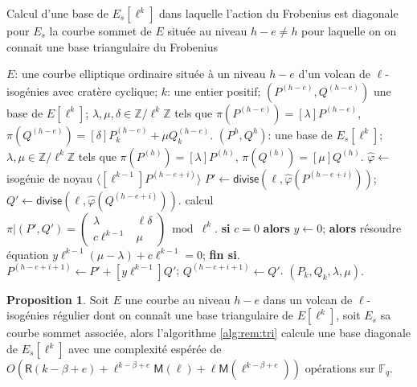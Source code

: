 \documentclass[10pt,a4paper]{book}
\theoremstyle{plain}
\theoremstyle{definition}
\theoremstyle{definition}
\theoremstyle{definition}
\newtheorem{prop}[thm]{Proposition}
\theoremstyle{definition}
\theoremstyle{remark}
\theoremstyle{remark}
\theoremstyle{definition}
\begin{document}
\begin{algorithm}
\caption{\label{alg:rem:tri}Calcul d'une base de $E_s[\ell^k]$ dans laquelle l'action du Frobenius est diagonale pour $E_s$ la courbe sommet de $E$ située au niveau $h-e \neq h$ pour laquelle on on connait une base triangulaire du Frobenius}
\begin{algorithmic}[1]
\REQUIRE $E$: une courbe elliptique ordinaire située à un niveau $h-e$ d'un volcan de $\ell$-isogénies avec cratère cyclique;
$k$: une entier positif; $(P^{(h-e)},Q^{(h-e)})$ une base de $E[\ell^k]$; $\lambda, \mu, \delta \in \mathbb{Z}/\ell^k \mathbb{Z}$
tels que $\pi(P^{(h-e)})= [\lambda] P^{(h-e)}$, $ \pi(Q^{(h-e)})=[\delta] P^{(h-e)}_{k} +  \mu Q^{(h-e)}_{k}$.
\ENSURE $(P^{h}, Q^{h} )$: une base de $E_s[\ell^k]$;
$\lambda, \mu \in \mathbb{Z}/\ell^k \mathbb{Z}$
tels que $\pi(P^{(h)})= [\lambda] P^{(h)}$, $ \pi(Q^{(h)})= [\mu] Q^{(h)}$.
\STATE\label{alg:rem:iso}  $\widehat{\varphi} \leftarrow $ isogénie de noyau $\langle [\ell^{k-1}]P^{(h-e+i)} \rangle$
\STATE\label{alg:rem:divide}
  $P' \leftarrow \mathsf{divise}(\ell, \widehat{\varphi}(P^{(h-e+i)}))$; $Q' \leftarrow \mathsf{divise} (\ell, \widehat{\varphi}(Q^{(h-e+i)}))$.
\STATE\label{alg:rem:frobenius}
  calcul $\pi|(P',Q')=\left( \begin{smallmatrix}
\lambda  & \ell \delta \\
c\ell^{k-1} & \mu  \end{smallmatrix} \right) \bmod {\ell^{k}}.$
\STATE 
  \textbf{si} $c=0$ \textbf{alors} $y \leftarrow 0 $; 
\STATE\label{alg:rem:solve1}
  \textbf{alors} résoudre équation
 $y\ell^{k-1}(\mu - \lambda) + c \ell^{k-1}=0$; \textbf{fin si}.
\STATE
  $P^{(h-e+i+1)} \leftarrow P' + [y \ell^{k-1}] Q'$; $Q^{(h-e+i+1)} \leftarrow Q'$.
\ENDFOR
\RETURN $(P_{k},Q_{k},\lambda,\mu).$
\end{algorithmic}
\end{algorithm}

\begin{prop}
\label{pro:alg:rem:tri}
Soit $E$ une courbe au niveau $h-e$ dans un volcan de $\ell$-isogénies régulier dont on connaît une base triangulaire de $E[\ell^k]$, soit $E_s$ sa courbe sommet associée, alors l'algorithme \ref{alg:rem:tri} calcule une base diagonale de $E_s[\ell^k]$ avec une complexité espérée de $O( \mathsf{R}(k-\beta+e) + \ell^{k-\beta+e}\mathsf{M}(\ell) + \ell\mathsf{M}(\ell^{k-\beta+e}))$ opérations sur $\mathbb{F}_q$.
\end{prop}
\end{document}
